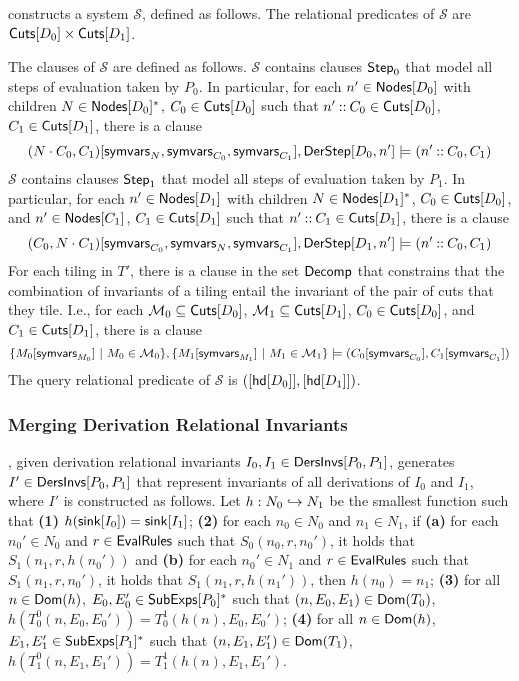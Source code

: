\verifyders constructs a system $\mathcal{S}$, defined as follows.
The relational predicates of $\mathcal{S}$ are $\mathsf{Cuts}[ D_0 ] \times
\mathsf{Cuts}[ D_1 ]$.

The clauses of $\mathcal{S}$ are defined as follows.
%
$\mathcal{S}$ contains clauses $\mathsf{Step}_0$ that model all steps
of evaluation taken by $P_0$.
%
In particular, for each $n' \in \mathsf{Nodes}[ D_0 ]$ with children $N \in
\mathsf{Nodes}[ D_0 ]^{*}$, %
$C_0 \in \mathsf{Cuts}[ D_0 ]$ such that $n' \mathbin{::} C_0 \in \mathsf{Cuts}[ D_0 ]$,
$C_1 \in \mathsf{Cuts}[ D_1 ]$, there is a clause %
\[ (N \concat C_0, C_1)[ \symvars{N}, \symvars{C_0}, \symvars{C_1} ], %
\derstep{D_0}{ n' } \entails %
(n' \cons C_0, C_1) \]
%
%
$\mathcal{S}$ contains clauses $\mathsf{Step}_1$ that model all steps
of evaluation taken by $P_1$.
%
In particular, for each $n' \in \mathsf{Nodes}[ D_1 ]$ with children $N \in
\mathsf{Nodes}[ D_1 ]^{*}$, %
$C_0 \in \mathsf{Cuts}[ D_0 ]$, and %
$n' \in \mathsf{Nodes}[ C_1 ]$, %
$C_1 \in \mathsf{Cuts}[ D_1 ]$ such that $n' \mathbin{::} C_1 \in \mathsf{Cuts}[ D_1 ]$, %
there is a clause %
\[ (C_0, N \concat C_1)[ \symvars{C_0}, \symvars{N}, \symvars{C_1} ], %
\derstep{D_1}{ n' } \entails %
(n' \cons C_0, C_1) \]
%
For each tiling in $T'$, there is a clause in the set $\mathsf{Decomp}$
that constrains that the combination of invariants of a tiling entail
the invariant of the pair of cuts that they tile.
%
I.e., for each $\mathcal{M}_0 \subseteq \mathsf{Cuts}[ D_0 ]$, %
$\mathcal{M}_1 \subseteq \mathsf{Cuts}[ D_1 ]$, %
$C_0 \in \mathsf{Cuts}[ D_0 ]$, and %
$C_1 \in \mathsf{Cuts}[ D_1 ]$, there is a clause
%
\[ \setformer{ M_0[ \symvars{ M_0 } ]}{ M_0 \in \mathcal{M}_0 }, %
\setformer{ M_1[ \symvars{ M_1 } ] }{ M_1 \in \mathcal{M}_1 } \entails %
(C_0[ \symvars{C_0} ], C_1[ \symvars{C_1} ])
\]
%
The query relational predicate of $\mathcal{S}$ is $( [ \mathsf{hd}[ D_0 ] ],
[ \mathsf{hd}[ D_1 ] ])$.

\subsubsection{Merging Derivation Relational Invariants}
%
\mergeinvs, given derivation relational invariants $I_0, I_1 \in
\mathsf{DersInvs}[ P_0, P_1 ]$, generates $I' \in \mathsf{DersInvs}[ P_0, P_1 ]$ that
represent invariants of all derivations of $I_0$ and $I_1$,
where $I'$ is constructed as follows.
Let $h : N_0 \hookrightarrow N_1$ be the smallest function such that %
\textbf{(1)} $h(\mathsf{sink}[ I_0 ]) = \mathsf{sink}[ I_1 ]$; %
\textbf{(2)} for each $n_0 \in N_0$ and $n_1 \in N_1$, if \textbf{(a)}
for each $n_0' \in N_0$ and $r \in \mathsf{EvalRules}$ such that $S_0(n_0, r,
n_0')$, it holds that $S_1(n_1, r, h(n_0'))$ and %
\textbf{(b)} for each $n_0' \in N_1$ and $r \in \mathsf{EvalRules}$ such that
$S_1(n_1, r, n_0')$, it holds that $S_1(n_1, r, h(n_1'))$, then
$h(n_0) = n_1$; 
\textbf{(3)} for all $n \in \mathsf{Dom}(h)$, $E_0, E_0' \in
\mathsf{SubExps}[ P_0 ]^{*}$ such that $(n, E_0, E_1) \in \mathsf{Dom}(T_0)$,
$h(T_0^0(n, E_0, E_0')) = T_0^1(h(n), E_0, E_0')$;
\textbf{(4)} for all $n \in \mathsf{Dom}(h)$, $E_1, E_1' \in
\mathsf{SubExps}[ P_1 ]^{*}$ such that $(n, E_1, E_1') \in \mathsf{Dom}(T_1)$,
$h(T_1^0(n, E_1, E_1')) = T_1^1(h(n), E_1, E_1')$.

